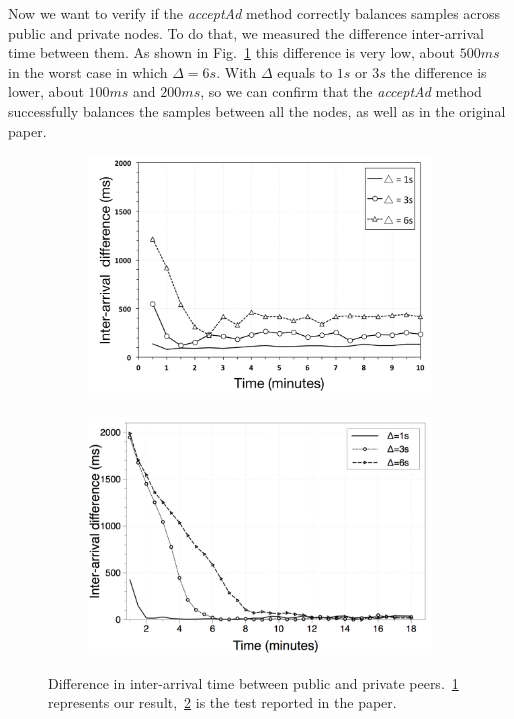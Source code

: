 Now we want to verify if the \textit{acceptAd} method correctly balances samples across public and private nodes. To do that, we measured the difference inter-arrival time between them. As shown in Fig.~\ref{fig:interarrivaltime_difference} this difference is very low, about $500 ms$ in the worst case in which $\Delta = 6 s$. With $\Delta$ equals to $1s$ or $3s$ the difference is lower, about $100ms$ and $200ms$, so we can confirm that the \textit{acceptAd} method successfully balances the samples between all the nodes, as well as in the original paper.

\begin{figure}
\centering
\begin{subfigure}{.5\textwidth}
  \centering
  \includegraphics[keepaspectratio=true, width=1\linewidth]{images/interarrivaltime_difference}
  \caption{}
  \label{fig:interarrivaltime_difference}
\end{subfigure}%
\begin{subfigure}{.5\textwidth}
  \centering
  \includegraphics[keepaspectratio=true, width=1\linewidth]{images/paper_interarrivaltime_difference}
  \caption{}
  \label{fig:paper_interarrivaltime_difference}
\end{subfigure}
\caption{Difference in inter-arrival time between public and private peers.~\ref{fig:interarrivaltime_difference} represents our result,~\ref{fig:paper_interarrivaltime_difference} is the test reported in the paper.}
\label{fig:ad_interarrivaltime_difference}
\end{figure}


